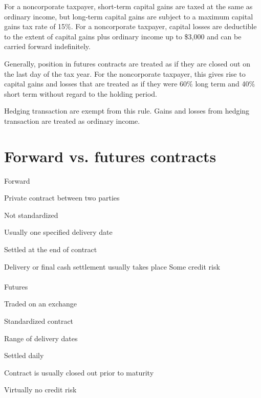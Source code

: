 \documentclass{article}
\begin{document}
For a noncorporate taxpayer, short-term capital gains are taxed at the same as ordinary income, but long-term capital gains are subject to a maximum capital gains tax rate of 15\%. For a noncorporate taxpayer, capital losses are deductible to the extent of capital gains plus ordinary income up to \$3,000 and can be carried forward indefinitely.

Generally, position in futures contracts are treated as if they are closed out on the last day of the tax year. For the noncorporate taxpayer, this gives rise to capital gains and losses that are treated as if they were 60\% long term and 40\% short term without regard to the holding period.

Hedging transaction are exempt from this rule. Gains and losses from hedging transaction are treated as ordinary income.

\section{Forward vs. futures contracts}
Forward 

Private contract between two parties 

Not standardized

Usually one specified delivery date 

Settled at the end of contract

Delivery or final cash settlement usually takes place
Some credit risk
\\ \hspace*{\fill}
\\
Futures

Traded on an exchange 

Standardized contract

Range of delivery dates

Settled daily

Contract is usually closed out prior to maturity 

Virtually no credit risk
\end{document}
